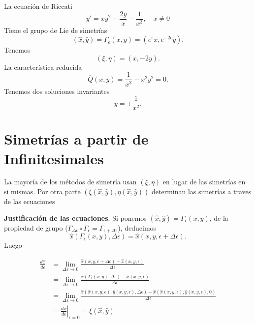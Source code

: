 \begin{ejemplo} La ecuación de Riccati
\[y'=xy^2-\frac{2y}{x}-\frac{1}{x^3},\quad x\neq 0\] 
 Tiene el grupo de Lie de simetrías
\[(\hat{x},\hat{y})=\Gamma_{\epsilon}(x,y)=(e^{\epsilon}x,e^{-2\epsilon}y).\]
Tenemos
\[(\xi,\eta)=(x,-2y).\]
La característica reducida
\[\overline{Q}(x,y)=\frac{1}{x^2}-x^2y^2=0.\]
Tenemos dos soluciones invariantes
\[y=\pm\frac{1}{x^2}.\] 

\end{ejemplo}

\section{Simetrías a partir de Infinitesimales }

 La mayoría de los métodos de simetría usan  $(\xi,\eta)$ en lugar de las simetrías en si mismas.
Por otra parte  $(\xi(\hat{x},\hat{y}),\eta(\hat{x},\hat{y}))$ determinan las simetrías a traves de las ecuaciones

\textbf{Justificación de las ecuaciones}. Si ponemos $(\hat{x},\hat{y})=\Gamma_{\epsilon}(x,y)$, de la propiedad de grupo ($ \Gamma_{\Delta\epsilon} \circ  \Gamma_{\epsilon}= \Gamma_{\epsilon+\Delta\epsilon}$), deducimos 
\[\hat{x}(\Gamma_{\epsilon}(x,y),\Delta\epsilon)=\hat{x}(x,y,\epsilon+\Delta\epsilon).\]
Luego

\[
\begin{split}
\frac{d\hat{x}}{d\epsilon}&=\lim_{\Delta\epsilon\to 0}\frac{\hat{x}(x,y,\epsilon+\Delta\epsilon)-\hat{x}(x,y,\epsilon)  }{\Delta\epsilon}\\
&=\lim_{\Delta\epsilon\to 0}\frac{\hat{x}(\Gamma_{\epsilon}(x,y),\Delta\epsilon)  -\hat{x}(x,y,\epsilon)  }{\Delta\epsilon}\\
&=\lim_{\Delta\epsilon\to 0}\frac{\hat{x}(\hat{x}(x,y,\epsilon),\hat{y}(x,y,\epsilon),\Delta\epsilon)  -\hat{x}(\hat{x}(x,y,\epsilon),\hat{y}(x,y,\epsilon),0)  }{\Delta\epsilon}\\
&=\left.\frac{d\hat{x}}{d\epsilon}\right|_{\epsilon=0}=\xi(\hat{x},\hat{y})
\end{split}
\]


